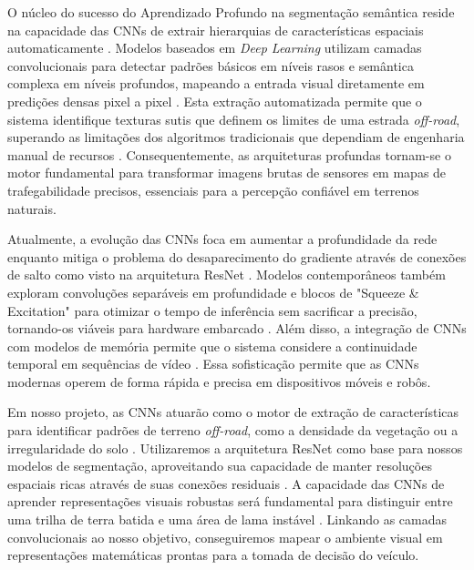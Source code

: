 \documentclass[a4paper,10pt, twocolumn]{article}
\begin{document}
O núcleo do sucesso do Aprendizado Profundo na segmentação semântica reside na capacidade das CNNs de extrair hierarquias de 
características espaciais automaticamente \cite{LATEEF2019321, 10.1145/3729420}. Modelos baseados em \textit{Deep Learning} 
utilizam camadas convolucionais para detectar padrões básicos em níveis 
rasos e semântica complexa em níveis profundos, mapeando a entrada
visual diretamente em predições densas pixel a pixel \cite{GARCIAGARCIA201841, 10742323}. Esta extração 
automatizada permite que o sistema identifique texturas sutis que definem os limites de uma estrada 
\textit{off-road}, superando as limitações dos algoritmos tradicionais que dependiam de engenharia manual de 
recursos \cite{KABIR2025102644, Sehar2022}. Consequentemente, as arquiteturas profundas tornam-se o motor 
fundamental para transformar imagens brutas de sensores em mapas de trafegabilidade precisos, essenciais para a 
percepção confiável em terrenos naturais.

Atualmente, a evolução das CNNs foca em aumentar a profundidade da rede enquanto mitiga o problema do desaparecimento do gradiente
através de conexões de salto como visto na arquitetura ResNet \cite{LATEEF2019321, Sgibnev2020}. Modelos contemporâneos também 
exploram convoluções
separáveis em profundidade e blocos de "Squeeze \& Excitation" para otimizar o tempo de inferência sem sacrificar a precisão, 
tornando-os
viáveis para hardware embarcado \cite{10.1145/3729420, Sgibnev2020}. Além disso, a integração de CNNs com 
modelos de memória permite que o sistema considere a
continuidade temporal em sequências de vídeo \cite{LATEEF2019321, Sehar2022}. Essa sofisticação 
permite que as CNNs modernas operem de forma rápida e precisa em
dispositivos móveis e robôs.

Em nosso projeto, as CNNs atuarão como o motor de extração de características para identificar padrões de terreno \textit{off-road},
como a densidade da vegetação ou a irregularidade do solo \cite{Maturana2017, 10742323}. Utilizaremos a arquitetura ResNet 
como base para
nossos modelos de segmentação, aproveitando sua capacidade de manter resoluções espaciais ricas através de suas conexões 
residuais \cite{Sgibnev2020, 10742323}. A
capacidade das CNNs de aprender representações visuais robustas será fundamental para distinguir entre uma trilha de terra batida e uma
área de lama instável \cite{9551643, s26061944}. Linkando as camadas convolucionais ao nosso objetivo, conseguiremos mapear o 
ambiente visual em representações
matemáticas prontas para a tomada de decisão do veículo.
\end{document}
